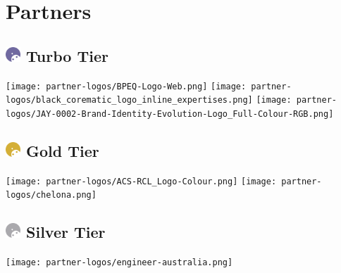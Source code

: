 \chapter{Partners}
\section{
    \includegraphics[width=1em]{../Assets/Partner Tier Icons/Turbo.png}
    \textcolor{turbo_purple}{Turbo Tier}
}
\begin{multicols}{2}
    \texttt{[image: partner-logos/BPEQ-Logo-Web.png]}
    \texttt{[image: partner-logos/black\_corematic\_logo\_inline\_expertises.png]}
    \texttt{[image: partner-logos/JAY-0002-Brand-Identity-Evolution-Logo\_Full-Colour-RGB.png]}
\end{multicols}

\section{
    \includegraphics[width=1em]{../Assets/Partner Tier Icons/Gold.png}
    \textcolor{partner_gold}{Gold Tier}
}
\begin{multicols}{2}
    \texttt{[image: partner-logos/ACS-RCL\_Logo-Colour.png]}
    \texttt{[image: partner-logos/chelona.png]}
\end{multicols}

\section{
    \includegraphics[width=1em]{../Assets/Partner Tier Icons/Silver.png}
    \textcolor{partner_silver}{Silver Tier}
}
\begin{multicols}{2}
    \texttt{[image: partner-logos/engineer-australia.png]}
\end{multicols}